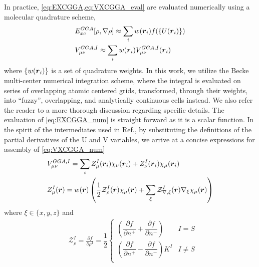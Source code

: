In practice, \cref{eq:EXCGGA,eq:VXCGGA_eval} are evaluated numerically using a molecular quadrature scheme,
\cite{Becke88_2547,Jackson90_7453,Laming93_997,Johnson95_169,Frisch96_213,Reveles04_681,Sierka11_3097}
\begin{align}
  &E_{xc}^{GGA}[\rho,\nabla\rho] \approx \sum_i w(\boldsymbol{r}_i) f(\{U(\boldsymbol{r}_i)\}) \label{eq:EXCGGA_num}\\
  &V^{GGA,I}_{\mu\nu} \approx \sum_i w(\boldsymbol{r}_i) V^{GGA,I}_{\mu\nu}(\boldsymbol{r}_i) \label{eq:VXCGGA_num}
\end{align}
where $\{w(\boldsymbol{r}_i)\}$ is a set of quadrature weights. 
In this work, we utilize the Becke multi-center numerical integration scheme,\cite{Becke88_2547}
where the integral is evaluated on series of overlapping atomic centered grids, transformed, through their weights, into ``fuzzy'', overlapping, and analytically continuous cells instead. 
We also refer the reader to a more thorough discussion regarding specific details.\cite{Becke88_2547,Frisch96_213}
The evaluation of \cref{eq:EXCGGA_num} is straight forward as it is a scalar function. In the spirit of the intermediates used
in Ref.\cite{Sierka11_3097}, by substituting the definitions of the partial derivatives of the U and V variables, we arrive
at a concise expressions for assembly of \cref{eq:VXCGGA_num} 
\begin{align}
&V^{GGA,I}_{\mu\nu} = \sum_i Z^I_\mu(\boldsymbol{r}_i) \chi_\nu(\boldsymbol{r}_i) + Z^I_\nu(\boldsymbol{r}_i) \chi_\mu(\boldsymbol{r}_i) \label{eq:VXC_point_update}\\
  &Z^I_\mu(\boldsymbol{r}) = w(\boldsymbol{r})
    \left(
      \frac{1}{2} \mathcal{Z}^I_{\rho}(\boldsymbol{r}) \chi_\mu(\boldsymbol{r}) + \sum_\xi \mathcal{Z}^I_{\nabla,\xi}(\boldsymbol{r}) \nabla_\xi \chi_\mu(\boldsymbol{r})
    \right) \label{eq:ZImu}
\end{align}
where $\xi \in \{x,y,z\}$ and
\begin{subequations}
\begin{align}
&\mathcal{Z}^I_{\rho}=     \frac{\partial f}{\partial \rho^I} =
                                     \dfrac{1}{2}
                                     \begin{cases}
  \left( \dfrac{\partial f}{\partial n^+} + \dfrac{\partial f}{\partial n^-} \right) & I = S \\[12pt]
  \left( \dfrac{\partial f}{\partial n^+} - \dfrac{\partial f}{\partial n^-} \right) K^{I} & I \neq S \\
                                     \end{cases}
\end{align}
\label{eq:ZrhoVar}
\end{subequations}

